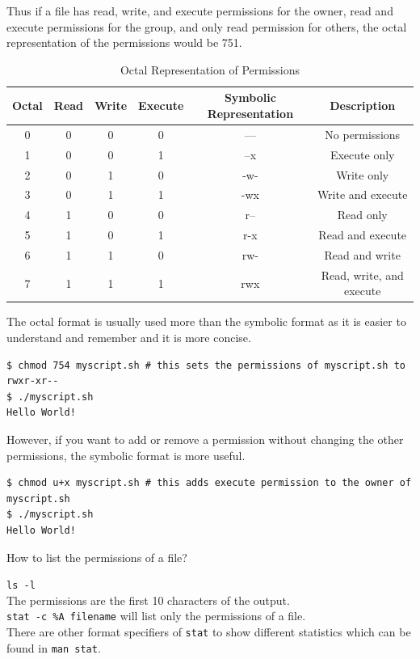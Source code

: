 Thus if a file has read, write, and execute permissions for the owner, read and execute permissions for the group, and only read permission for others, the octal representation of the permissions would be 751.

\begin{table}
\caption{Octal Representation of Permissions}
\begin{tabular}{ c c c c c c }
  \toprule
  Octal & Read & Write & Execute & Symbolic Representation & Description \\
 \midrule
  0 & 0 & 0 & 0 & --- & No permissions \\
  1 & 0 & 0 & 1 & --x & Execute only \\
  2 & 0 & 1 & 0 & -w- & Write only \\
  3 & 0 & 1 & 1 & -wx & Write and execute \\
  4 & 1 & 0 & 0 & r-- & Read only \\
  5 & 1 & 0 & 1 & r-x & Read and execute \\
  6 & 1 & 1 & 0 & rw- & Read and write \\
  7 & 1 & 1 & 1 & rwx & Read, write, and execute \\
 \bottomrule
\end{tabular}
\end{table}

The octal format is usually used more than the symbolic format as it is easier to understand and remember and it is more concise.

\begin{lstlisting}
$ chmod 754 myscript.sh # this sets the permissions of myscript.sh to rwxr-xr--
$ ./myscript.sh
Hello World!
\end{lstlisting}

However, if you want to add or remove a permission without changing the other permissions, the symbolic format is more useful.

\begin{lstlisting}
$ chmod u+x myscript.sh # this adds execute permission to the owner of myscript.sh
$ ./myscript.sh
Hello World!
\end{lstlisting}

\begin{qs}
  How to list the permissions of a file?
\end{qs}

\begin{ans}
  \texttt{ls -l} \\
  The permissions are the first 10 characters of the output.\\
  \texttt{stat -c \%A filename} will list only the permissions of a file.\\
  There are other format specifiers of \texttt{stat} to show different statistics
  which can be found in \texttt{man stat}.
\end{ans}

